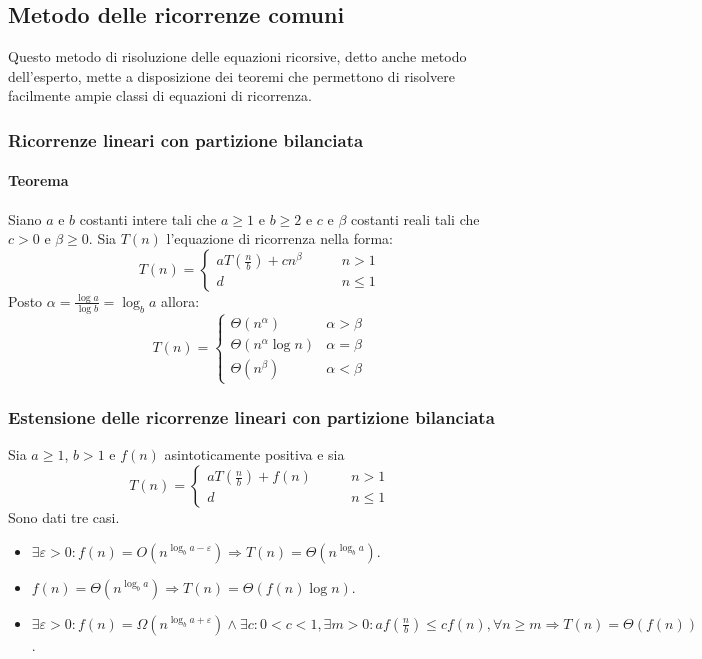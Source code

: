 \subsection{Metodo delle ricorrenze comuni}
Questo metodo di risoluzione delle equazioni ricorsive, detto anche metodo dell'esperto, mette a disposizione dei teoremi che permettono di risolvere 
facilmente ampie classi di equazioni di ricorrenza.
\subsubsection{Ricorrenze lineari con partizione bilanciata}
\paragraph{Teorema}
Siano $a$ e $b$ costanti intere tali che $a\ge 1$ e $b\ge 2$ e $c$ e $\beta$ costanti reali tali che $c>0$ e $\beta\ge 0$. Sia $T(n)$ l'equazione di 
ricorrenza nella forma:
\begin{equation*}
T(n)=
\begin{cases}
aT(\frac{n}{b})+cn^\beta\quad\quad & n>1\\
d & n\le 1
\end{cases}
\end{equation*}
Posto $\alpha=\frac{\log a}{\log b}=\log_b a$ allora:
\begin{equation*}
T(n)=
\begin{cases}
\Theta(n^\alpha) \quad\quad & \alpha>\beta\\ 
\Theta(n^\alpha\log n) & \alpha=\beta\\ 
\Theta(n^\beta) & \alpha<\beta
\end{cases}
\end{equation*}
\subsubsection{Estensione delle ricorrenze lineari con partizione bilanciata}
Sia $a\ge 1$, $b>1$ e $f(n)$ asintoticamente positiva e sia 
\begin{equation*}
T(n)=
\begin{cases}
aT(\frac{n}{b})+f(n)\quad\quad & n>1\\
d & n\le 1
\end{cases}
\end{equation*}
Sono dati tre casi.
\begin{itemize}
\item $\exists \varepsilon >0: f(n)=O(n^{\log_ba-\varepsilon})\Rightarrow T(n)=\Theta(n^{\log_ba})$.
\item $f(n)=\Theta(n^{\log_ba})\Rightarrow T(n)=\Theta(f(n)\log n)$.
\item $\exists\varepsilon>0:f(n)=\Omega(n^{\log_ba+\varepsilon})\land \exists c:0<c<1, \exists m>0:af(\frac{n}{b})\le cf(n),\forall n\ge m\Rightarrow T(n)=
\Theta(f(n))$.
\end{itemize}
